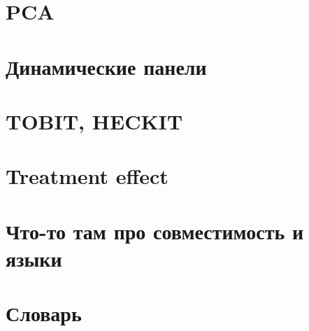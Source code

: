 \documentclass[]{book}
\begin{document}
\hypertarget{pca}{%
\chapter{PCA}\label{pca}}

\hypertarget{dinpanel}{%
\chapter{Динамические панели}\label{dinpanel}}

\hypertarget{tobit_heckit}{%
\chapter{TOBIT, HECKIT}\label{tobit_heckit}}

\hypertarget{treatment}{%
\chapter{Treatment effect}\label{treatment}}

\hypertarget{compatability}{%
\chapter{Что-то там про совместимость и языки}\label{compatability}}

\hypertarget{dict}{%
\chapter{Словарь}\label{dict}}


\end{document}

